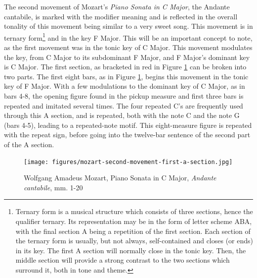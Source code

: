 The second movement of Mozart's \textit{Piano Sonata in C Major}, the Andante cantabile, is marked with the modifier  meaning  and is reflected in the overall tonality of this movement being similar to a very sweet song. This movement is in ternary form\footnote{Ternary form is a musical structure which consists of three sections, hence the qualifier ternary. Its representation may be in the form of letter scheme ABA, with the final section A being a repetition of the first section. Each section of the ternary form is usually, but not always, self-contained and closes (or ends) in its key. The first A section will normally close in the tonic key. Then, the middle section will provide a strong contrast to the two sections which surround it, both in tone and theme.} and in the key F Major. This will be an important concept to note, as the first movement was in the tonic key of C Major. This movement modulates the key, from C Major to its subdominant F Major, and F Major's dominant key is C Major. The first  section, as bracketed in red in Figure \ref{fig:mozart-second-movement-first-a-section}\autocite{Henle_1977} can be broken into two parts. The first eight bars, as in Figure \ref{fig:mozart-second-movement-first-a-section}\autocite{Henle_1977}, begins this movement in the tonic key of F Major. With a few modulations to the dominant key of C Major, as in bars 4-8, the opening figure found in the pickup measure and first three bars is repeated and imitated several times. The four repeated C's are frequently used through this A section, and is repeated, both with the note C and the note G (bars 4-5), leading to a repeated-note motif. This eight-measure figure is repeated with the repeat sign, before going into the twelve-bar sentence of the second part of the A section. 

\begin{figure}
    \centering
    \texttt{[image: figures/mozart-second-movement-first-a-section.jpg]}
    \caption{Wolfgang Amadeus Mozart, Piano Sonata in C Major, \textit{Andante cantabile}, mm. 1-20}
    \label{fig:mozart-second-movement-first-a-section}
\end{figure}

